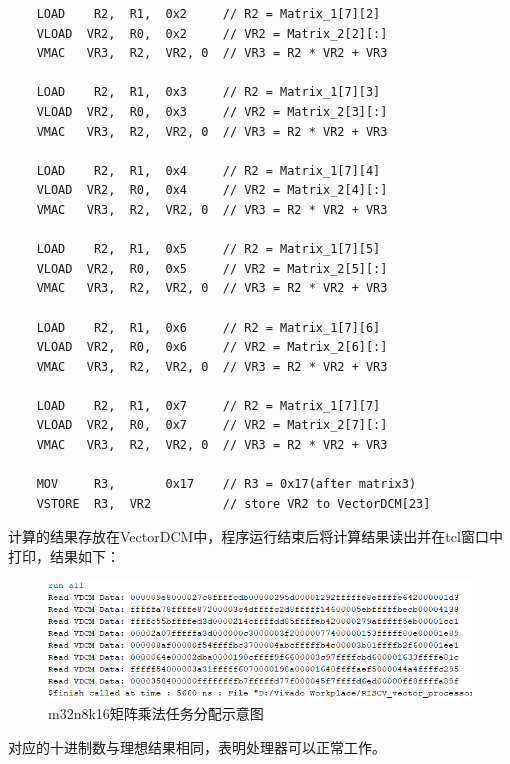 \documentclass[UTF8]{ctexart}
\begin{document}
\begin{lstlisting}
    LOAD    R2,  R1,  0x2     // R2 = Matrix_1[7][2]
    VLOAD  VR2,  R0,  0x2     // VR2 = Matrix_2[2][:]
    VMAC   VR3,  R2,  VR2, 0  // VR3 = R2 * VR2 + VR3

    LOAD    R2,  R1,  0x3     // R2 = Matrix_1[7][3]
    VLOAD  VR2,  R0,  0x3     // VR2 = Matrix_2[3][:]
    VMAC   VR3,  R2,  VR2, 0  // VR3 = R2 * VR2 + VR3

    LOAD    R2,  R1,  0x4     // R2 = Matrix_1[7][4]
    VLOAD  VR2,  R0,  0x4     // VR2 = Matrix_2[4][:]
    VMAC   VR3,  R2,  VR2, 0  // VR3 = R2 * VR2 + VR3

    LOAD    R2,  R1,  0x5     // R2 = Matrix_1[7][5]
    VLOAD  VR2,  R0,  0x5     // VR2 = Matrix_2[5][:]
    VMAC   VR3,  R2,  VR2, 0  // VR3 = R2 * VR2 + VR3

    LOAD    R2,  R1,  0x6     // R2 = Matrix_1[7][6]
    VLOAD  VR2,  R0,  0x6     // VR2 = Matrix_2[6][:]
    VMAC   VR3,  R2,  VR2, 0  // VR3 = R2 * VR2 + VR3

    LOAD    R2,  R1,  0x7     // R2 = Matrix_1[7][7]
    VLOAD  VR2,  R0,  0x7     // VR2 = Matrix_2[7][:]
    VMAC   VR3,  R2,  VR2, 0  // VR3 = R2 * VR2 + VR3

    MOV     R3,       0x17    // R3 = 0x17(after matrix3)
    VSTORE  R3,  VR2          // store VR2 to VectorDCM[23]

\end{lstlisting}

计算的结果存放在VectorDCM中，程序运行结束后将计算结果读出并在tcl窗口中打印，结果如下：

\begin{figure}[htbp]
    \centering
    \includegraphics[width=16cm]{pic/matrix_result.png}
    \caption{m32n8k16矩阵乘法任务分配示意图}
\end{figure}

对应的十进制数与理想结果相同，表明处理器可以正常工作。
\end{document}
